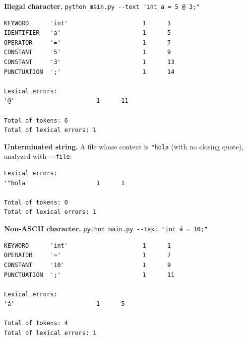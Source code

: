 \documentclass[11pt,letterpaper]{article}
\newcommand{\tok}[1]{\texttt{#1}}
\begin{document}
\par\noindent\begin{minipage}{\linewidth}
\textbf{Illegal character.} \tok{python main.py -{}-text "int a = 5 @ 3;"}\par\smallskip
\begin{lstlisting}[style=console]
KEYWORD      'int'                     1      1
IDENTIFIER   'a'                       1      5
OPERATOR     '='                       1      7
CONSTANT     '5'                       1      9
CONSTANT     '3'                       1      13
PUNCTUATION  ';'                       1      14

Lexical errors:
'@'                       1      11

Total of tokens: 6
Total of lexical errors: 1
\end{lstlisting}
\end{minipage}\par\smallskip

\par\noindent\begin{minipage}{\linewidth}
\textbf{Unterminated string.} A file whose content is \tok{"hola} (with no
closing quote), analyzed with \tok{-{}-file}:\par\smallskip
\begin{lstlisting}[style=console]
Lexical errors:
'"hola'                   1      1

Total of tokens: 0
Total of lexical errors: 1
\end{lstlisting}
\end{minipage}\par\smallskip

\par\noindent\begin{minipage}{\linewidth}
\textbf{Non-ASCII character.} \tok{python main.py -{}-text "int á = 10;"}\par\smallskip
\begin{lstlisting}[style=console]
KEYWORD      'int'                     1      1
OPERATOR     '='                       1      7
CONSTANT     '10'                      1      9
PUNCTUATION  ';'                       1      11

Lexical errors:
'á'                       1      5

Total of tokens: 4
Total of lexical errors: 1
\end{lstlisting}
\end{minipage}\par\smallskip
\end{document}
